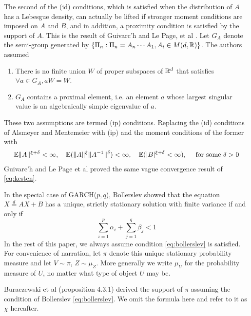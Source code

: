 The second of the (id) conditions, which is satisfied when the
distribution of $A$ has a Lebesgue density, can actually be lifted if
stronger moment conditions are imposed on $A$ and $B$, and in
addition, a proximity condition is satisfied by the support of
$A$. This is the result of Guivarc'h and Le Page, et al
\cite{guivarc:page:2016}. Let $G_A$ denote the semi-group generated
by $\{\Pi_n: \Pi_n = A_n \cdots A_1, A_i \in M(d, \mathbb R)\}$. The
authors assumed
\begin{enumerate}
  \item There is no finite union $W$ of proper subspaces of $\mathbb R^d$
    that satisfies $\forall a \in G_A, a W = W$.
  \item $G_A$ contains a proximal element, i.e. an element $a$ whose
    largest singular value is an algebraically simple eigenvalue of $a$.
\end{enumerate}
These two assumptions are termed (ip) conditions. Replacing the (id)
conditions of Alsmeyer and Mentemeier with (ip) and the moment
conditions of the former with
\[
\mathbb{E} \|A\|^{\xi + \delta} < \infty, \quad
\mathbb{E} (\|A\|^{\xi} \|A^{-1}\|^{\delta}) < \infty, \quad
\mathbb{E} (|B|^{\xi + \delta} < \infty),\quad
\text{ for some }\delta > 0
\]
Guivarc'h and Le Page et al proved the same vague convergence result
of \eqref{eq:kesten}.

In the special case of GARCH($p, q$),
Bollerslev \cite{bollerslev:1986} showed that the 
equation $X \overset{d}{=} A X + B$ has a unique, strictly
stationary solution with finite variance if and only if
\begin{equation}
  \sum_{i=1}^p \alpha_i + \sum_{j=1}^q \beta_j < 1
  \label{eq:bollerslev}
\end{equation}
In the rest of this paper, we always assume condition
\eqref{eq:bollerslev} is satisfied. For convenience of narration, let
$\pi$ denote this unique stationary probability measure and let
$V \sim \pi$, $Z \sim \mu_Z$. More generally we write $\mu_U$ for the
probability measure of $U$, no matter what type of object $U$ may be.

Buraczewski et al \cite{buraczewski:damek:mikosch:2016} (proposition
4.3.1) derived the support of $\pi$ assuming the condition of
Bollerslev \ref{eq:bollerslev}. We omit the formula here and refer to it as
$\chi$ hereafter.


